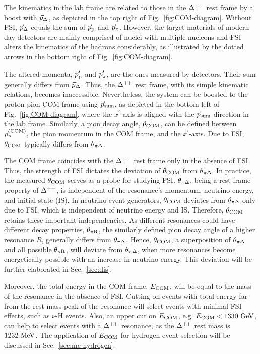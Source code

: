 The kinematics in the lab frame are related to those in the $\Delta^{++}$ rest frame by a boost with $\vec{p}_{\Delta}$, as depicted in the top right of Fig.~\ref{fig:COM-diagram}. 
Without FSI, $\vec{p}_{\Delta}$ equals the sum of $\vec{p}_\textrm{p}$ and $\vec{p}_{\pi}$.
However, the target materials of modern day detectors are mainly comprised of nuclei with multiple nucleons and FSI alters the kinematics of the hadrons considerably, as illustrated by the dotted arrows in the bottom right of Fig.~\ref{fig:COM-diagram}.

The altered momenta, $\vec{p}_\textrm{p}^{\prime}$ and $\vec{p}_{\pi}^{\prime}$, are the ones measured by detectors. 
Their sum generally differs from $\vec{p}_{\Delta}$.
Thus, the $\Delta^{++}$ rest frame, with its simple kinematic relations, becomes inaccessible.
Nevertheless, the system can be boosted to the proton-pion COM frame using $\vec{p}_{\textrm{sum}}$, as depicted in the bottom left of Fig.~\ref{fig:COM-diagram}, where the $x^{\prime}$-axis is aligned with the $\vec{p}_{\textrm{sum}}$ direction in the lab frame.
Similarly, a pion decay angle, $\theta_{\textrm{COM}}$, can be defined between $\vec{p}_{\pi}^{(\textrm{COM})}$, the pion momentum in the COM frame, and the $x^{\prime}$-axis.
Due to FSI, $\theta_{\textrm{COM}}$ typically differs from $\theta_{\pi\Delta}$. 

The COM frame coincides with the $\Delta^{++}$ rest frame only in the absence of FSI.
Thus, the strength of FSI dictates the deviation of $\theta_{\textrm{COM}}$ from $\theta_{\pi\Delta}$. 
In practice, the measured $\theta_{\textrm{COM}}$ serves as a probe for studying FSI. 
$\theta_{\pi\Delta}$, being a rest-frame property of $\Delta^{++}$, is independent of the resonance's momentum, neutrino energy, and initial state (IS).
In neutrino event generators, $\theta_{\textrm{COM}}$ deviates from $\theta_{\pi\Delta}$ only due to FSI, which is independent of neutrino energy and IS.
Therefore, $\theta_{\textrm{COM}}$ retains these important independencies.
As different resonances could have different decay properties, $\theta_{\pi\textrm{R}}$, the similarly defined pion decay angle of a higher resonance $R$, generally differs from $\theta_{\pi\Delta}$. 
Hence, $\theta_{\textrm{COM}}$, a superposition of $\theta_{\pi\Delta}$ and all possible $\theta_{\pi\textrm{R}}$, will deviate from $\theta_{\pi\Delta}$, when more resonances become energetically possible with an increase in neutrino energy. 
This deviation will be further elaborated in Sec.~\ref{sec:dis}.

Moreover, the total energy in the COM frame, $E_{\textrm{COM}}$, will be equal to the mass of the resonance in the absence of FSI.
Cutting on events with total energy far from the rest mass peak of the resonance will select events with minimal FSI effects, such as $\nu$-H events. 
Also, an upper cut on $E_{\textrm{COM}}$, e.g. $E_{\textrm{COM}}<1330~\textrm{GeV}$, can help to select events with a $\Delta^{++}$ resonance, as the $\Delta^{++}$ rest mass is $1232~\textrm{MeV}$.
The application of $E_{\textrm{COM}}$ for hydrogen event selection will be discussed in Sec.~\ref{sec:mc-hydrogen}.

